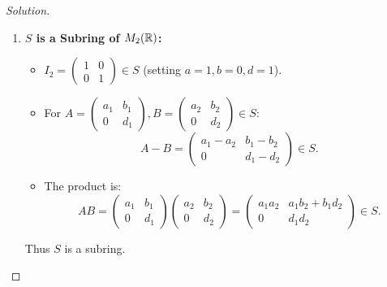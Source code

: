 \begin{proof}[Solution]
\begin{enumerate}[label=\arabic*., leftmargin=*]
    \item \textbf{$S$ is a Subring of $M_2(\mathbb{R})$:}
    \begin{itemize}[leftmargin=1.5em, itemsep=3pt]
        \item $I_2 = \begin{pmatrix} 1 & 0 \\ 0 & 1 \end{pmatrix} \in S$ (setting $a = 1, b = 0, d = 1$).
        \item For $A = \begin{pmatrix} a_1 & b_1 \\ 0 & d_1 \end{pmatrix}, B = \begin{pmatrix} a_2 & b_2 \\ 0 & d_2 \end{pmatrix} \in S$:
        \begin{equation*}
        A - B = \begin{pmatrix} a_1 - a_2 & b_1 - b_2 \\ 0 & d_1 - d_2 \end{pmatrix} \in S.
        \end{equation*}
        \item The product is:
        \begin{equation*}
        AB = \begin{pmatrix} a_1 & b_1 \\ 0 & d_1 \end{pmatrix}\begin{pmatrix} a_2 & b_2 \\ 0 & d_2 \end{pmatrix} = \begin{pmatrix} a_1 a_2 & a_1 b_2 + b_1 d_2 \\ 0 & d_1 d_2 \end{pmatrix} \in S.
        \end{equation*}
    \end{itemize}
    Thus $S$ is a subring.


\end{enumerate}
\end{proof}
